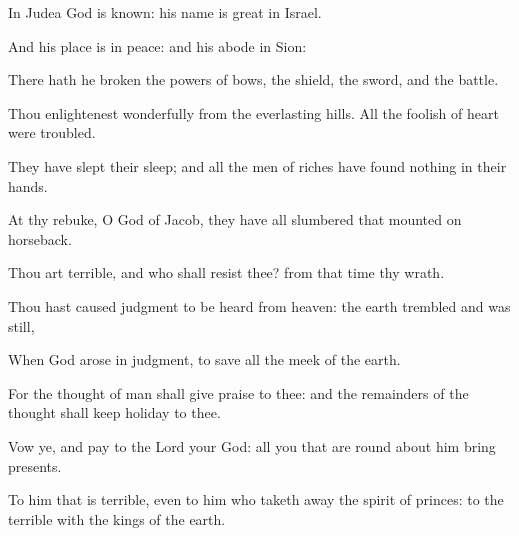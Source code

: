 ﻿\item In Judea God is known: his name is great in Israel.
\item And his place is in peace: and his abode in Sion:
\item There hath he broken the powers of bows, the shield, the sword, and the battle.
\item Thou enlightenest wonderfully from the everlasting hills. All the foolish of heart were troubled.
\item They have slept their sleep; and all the men of riches have found nothing in their hands.
\item At thy rebuke, O God of Jacob, they have all slumbered that mounted on horseback.
\item Thou art terrible, and who shall resist thee? from that time thy wrath.
\item Thou hast caused judgment to be heard from heaven: the earth trembled and was still,
\item When God arose in judgment, to save all the meek of the earth.
\item For the thought of man shall give praise to thee: and the remainders of the thought shall keep holiday to thee.
\item Vow ye, and pay to the Lord your God: all you that are round about him bring presents.
\item To him that is terrible, even to him who taketh away the spirit of princes: to the terrible with the kings of the earth.